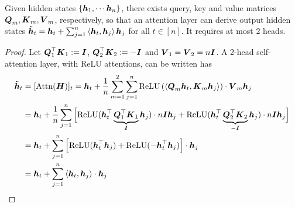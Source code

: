 \begin{lemma}
  \label{lemma:inner_product}
    Given hidden states $\{\bh_1, \cdots \bh_n\}$, there exists query, key and value matrices $\bQ_m, \bK_m, \bV_m$, respectively, so that an attention layer can derive output hidden states $\tilde{\bh}_t = \bh_t +\sum_{j=1}^n \inner {\bh_t, \bh_j} \bh_j$ for all $t \in [n]$. It requires at most 2 heads.   
\end{lemma}
\begin{proof}
        Let $\bQ_1^\top \bK_1 : = \bI$, $\bQ_2^\top \bK_2 : = -\bI$ and $\bV_1 = \bV_2 = n\bI$. A 2-head self-attention layer, with ReLU attentions, can be written has 
    \begin{equation}
    \begin{aligned}
        \tilde{\bh}_t &= [\mathrm{Attn}(\bH)]_t = \bh_t + \frac{1}{n} \sum_{m=1}^2 \sum_{j=1}^n \mathrm{ReLU} \left(\inner{\bQ_m \bh_t, \bK_m \bh_j}\right) \cdot \bV_m \bh_j \\
        &= \bh_t + \frac{1}{n} \sum_{j=1}^n \Big[\mathrm{ReLU} (\bh_t^\top \underbrace{\bQ_1^\top \bK_1}_{\bI} \bh_j) \cdot n\bI \bh_j  + \mathrm{ReLU} (\bh_t^\top \underbrace{\bQ_2^\top \bK_2}_{-\bI} \bh_j) \cdot n\bI \bh_j  \Big] \\
        &= \bh_t + \sum_{j=1}^n \Big[\mathrm{ReLU} (\bh_t^\top \bh_j) + \mathrm{ReLU} (-\bh_t^\top  \bh_j) \Big] \cdot  \bh_j   \\
        &= \bh_t +  \sum_{j=1}^n \inner{\bh_t, \bh_j} \cdot \bh_j  
    \end{aligned} 
    \end{equation}
\end{proof}
